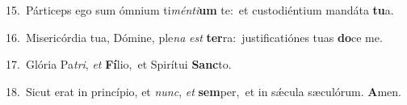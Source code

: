 {\numbfont\textcolor{\numbcolor}{15.}}~Párticeps ego sum ómnium ti\-\textit{mén}\-\textit{ti}\textbf{um} te:~\star et custodiéntium mandáta \textbf{tu}\-a.\par
{\numbfont\textcolor{\numbcolor}{16.}}~Misericórdia tua, Dómine, ple\textit{na} \textit{est} \textbf{ter}\-ra:~\star justificatiónes tuas \textbf{do}\-ce me.\par
{\numbfont\textcolor{\numbcolor}{17.}}~Glória Pa\-\textit{tri}\-, \textit{et} \textbf{Fí}\-lio,~\star et Spirítui \textbf{Sanc}\-to.\par
{\numbfont\textcolor{\numbcolor}{18.}}~Sicut erat in princípio, et \textit{nunc}\-, \textit{et} \textbf{sem}\-per,~\star et in sǽcula sæculórum. \textbf{A}\-men.\par
